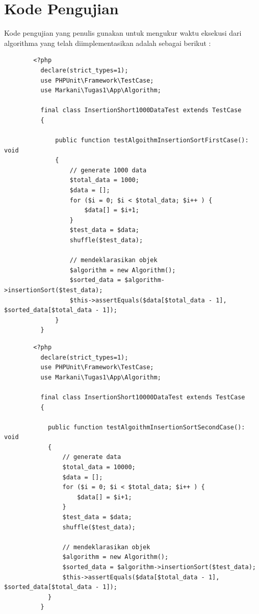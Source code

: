 \documentclass[12pt,a4paper,oneside]{report}
\begin{document}
    \section{Kode Pengujian}
      Kode pengujian yang penulis gunakan untuk mengukur waktu eksekusi dari algorithma yang telah diimplementasikan adalah sebagai berikut :
      \begin{lstlisting}
        <?php
          declare(strict_types=1);
          use PHPUnit\Framework\TestCase;
          use Markani\Tugas1\App\Algorithm;

          final class InsertionShort1000DataTest extends TestCase
          {

              public function testAlgoithmInsertionSortFirstCase(): void
              {
                  // generate 1000 data
                  $total_data = 1000;
                  $data = [];
                  for ($i = 0; $i < $total_data; $i++ ) {
                      $data[] = $i+1;
                  }
                  $test_data = $data;
                  shuffle($test_data);

                  // mendeklarasikan objek
                  $algorithm = new Algorithm();
                  $sorted_data = $algorithm->insertionSort($test_data);
                  $this->assertEquals($data[$total_data - 1], $sorted_data[$total_data - 1]);
              }
          }
      \end{lstlisting}

      \begin{lstlisting}
        <?php
          declare(strict_types=1);
          use PHPUnit\Framework\TestCase;
          use Markani\Tugas1\App\Algorithm;

          final class InsertionShort10000DataTest extends TestCase
          {

            public function testAlgoithmInsertionSortSecondCase(): void
            {
                // generate data
                $total_data = 10000;
                $data = [];
                for ($i = 0; $i < $total_data; $i++ ) {
                    $data[] = $i+1;
                }
                $test_data = $data;
                shuffle($test_data);

                // mendeklarasikan objek
                $algorithm = new Algorithm();
                $sorted_data = $algorithm->insertionSort($test_data);
                $this->assertEquals($data[$total_data - 1], $sorted_data[$total_data - 1]);
            }
          }
      \end{lstlisting}
\end{document}
